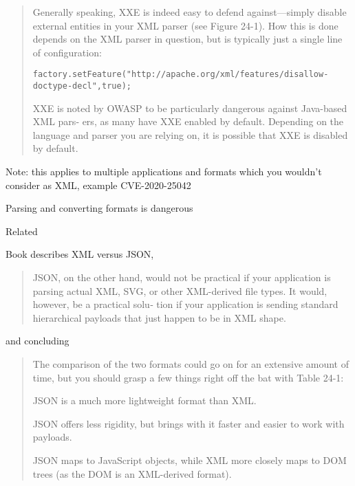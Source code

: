 \documentclass[Screen16to9,17pt]{foils}
\begin{document}


\begin{quote}\small
Generally speaking, XXE is indeed easy to defend against—simply disable external
entities in your XML parser (see Figure 24-1). How this is done depends on the XML
parser in question, but is typically just a single line of configuration:
\begin{alltt}
factory.setFeature("http://apache.org/xml/features/disallow-doctype-decl", true);
\end{alltt}
XXE is noted by OWASP to be particularly dangerous against Java-based XML pars‐
ers, as many have XXE enabled by default. Depending on the language and parser
you are relying on, it is possible that XXE is disabled by default.
\end{quote}

\begin{list2}
\item Note: this applies to multiple applications and formats which you wouldn't consider as XML, example CVE-2020-25042\\
\item Parsing and converting formats is dangerous
\item {}
\item {}
\item Related 
\end{list2}



Book describes XML versus JSON,

\begin{quote}\small
JSON, on the other hand, would not be practical if your application is parsing actual
XML, SVG, or other XML-derived file types. It would, however, be a practical solu‐
tion if your application is sending standard hierarchical payloads that just happen to
be in XML shape.
\end{quote}

and concluding
\begin{quote}\small
The comparison of the two formats could go on for an extensive amount of time, but
you should grasp a few things right off the bat with Table 24-1:
\begin{list2}
\item JSON is a much more lightweight format than XML.
\item JSON offers less rigidity, but brings with it faster and easier to work with
payloads.
\item JSON maps to JavaScript objects, while XML more closely maps to DOM trees
(as the DOM is an XML-derived format).
\end{list2}
\end{quote}
\end{document}
